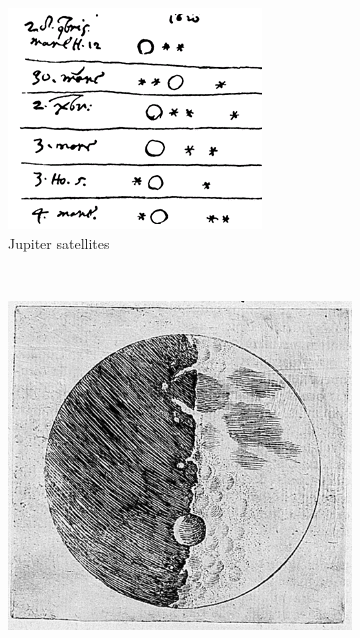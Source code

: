 \begin{figure}
\center
    \centering
    \begin{subfigure}[b]{0.3\textwidth}
    	\centering
    	\includegraphics[width=\linewidth]{Figures/0_galileodrawings_1.png}
        \caption{Jupiter satellites}
        \label{Fig:0_galileo_1}
    \end{subfigure}
    ~~
    \begin{subfigure}[b]{0.3\textwidth}
    	\centering
    	\includegraphics[width=0.9\linewidth]{Figures/0_galileodrawings_2.jpg}

\end{subfigure}
\end{figure}
